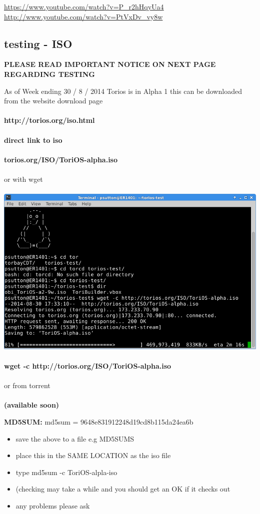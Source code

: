 \documentclass[12pt,a4paper]{book}
\begin{document}
\url{https://www.youtube.com/watch?v=P_r2hHqyUa4} \\
\url{http://www.youtube.com/watch?v=PtVxDv_vy8w} \\

\newpage
\subsection {testing - ISO}
\bf{PLEASE READ IMPORTANT NOTICE ON NEXT PAGE REGARDING TESTING}

As of Week ending 30 / 8 / 2014 Torios is in Alpha 1 this can be downloaded from the website download page  \\ \\
\textbf{http://torios.org/iso.html}\\ \\
\textbf{direct link to iso} \\ \\
\textbf{torios.org/ISO/ToriOS-alpha.iso} \\ \\
or with wget  \\ \\

\includegraphics[width=0.7\linewidth]{torios-wget-download} \\ \\
\textbf{wget -c http://torios.org/ISO/ToriOS-alpha.iso} \\ \\
or from torrent \\ \\
\textbf{(available soon)}

\textbf{MD5SUM: } md5sum = 9648e831912248d19cd8b115da24ea6b \\ 
\begin{itemize}
\item{save the above to a file e.g MD5SUMS}
\item{place this in the SAME LOCATION as the iso file}
\item{type md5sum -c ToriOS-alpla-iso} 
\item({checking may take a while and you should get an OK if it checks out}
\item{any problems please ask}
\end{itemize}
\end{document}
